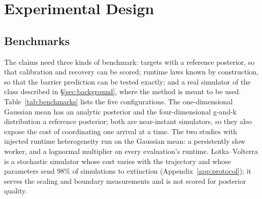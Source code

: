 \documentclass[10pt]{article}
\theoremstyle{plain}
\theoremstyle{definition}
\begin{document}
\section{Experimental Design}\label{sec:experiments}

\subsection{Benchmarks}\label{sec:experiments-suite}
The claims need three kinds of benchmark: targets with a reference posterior, so that calibration and recovery can be scored; runtime laws known by construction, so that the barrier prediction can be tested exactly; and a real simulator of the class described in \S\ref{sec:background}, where the method is meant to be used. Table~\ref{tab:benchmarks} lists the five configurations. The one-dimensional Gaussian mean has an analytic posterior and the four-dimensional g-and-k distribution \citep{rayner2002gk} a reference posterior; both are near-instant simulators, so they also expose the cost of coordinating one arrival at a time. The two studies with injected runtime heterogeneity run on the Gaussian mean: a persistently slow worker, and a lognormal multiplier on every evaluation's runtime. Lotka--Volterra is a stochastic simulator whose cost varies with the trajectory and whose parameters send $98\%$ of simulations to extinction (Appendix~\ref{app:protocol}); it serves the scaling and boundary measurements and is not scored for posterior quality.
\end{document}
